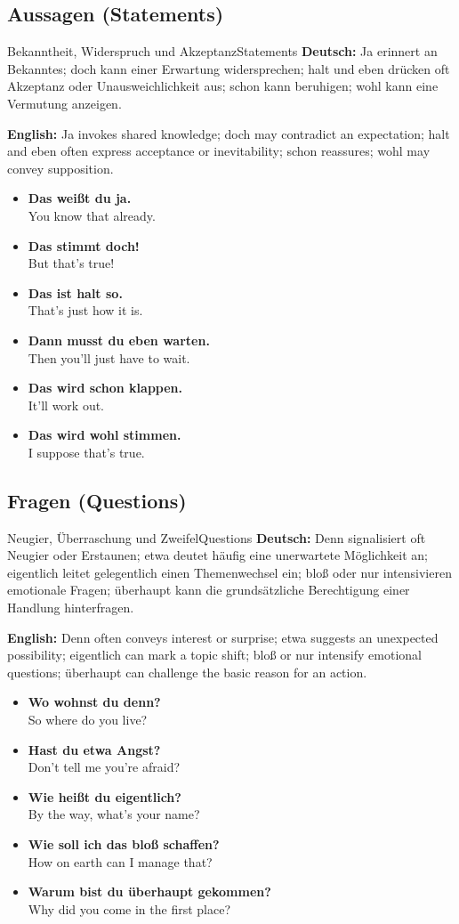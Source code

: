 \documentclass[a4paper,11pt]{article}
\newcommand{\GermanText}[1]{\textbf{Deutsch: }#1\par}
\newcommand{\EnglishText}[1]{{\small\color{SoftGray}\textbf{English: }#1\par}}
\newcommand{\ExampleItem}[2]{\item \textbf{#1}\\{\small\color{SoftGray}#2}}
\begin{document}
\subsection{Aussagen \textnormal{(Statements)}}
\begin{grammarentry}{Bekanntheit, Widerspruch und Akzeptanz}{Statements}
\GermanText{Ja erinnert an Bekanntes; doch kann einer Erwartung widersprechen; halt und eben drücken oft Akzeptanz oder Unausweichlichkeit aus; schon kann beruhigen; wohl kann eine Vermutung anzeigen.}
\EnglishText{Ja invokes shared knowledge; doch may contradict an expectation; halt and eben often express acceptance or inevitability; schon reassures; wohl may convey supposition.}
\end{grammarentry}
\begin{exbox}\begin{itemize}
\ExampleItem{Das weißt du ja.}{You know that already.}
\ExampleItem{Das stimmt doch!}{But that's true!}
\ExampleItem{Das ist halt so.}{That's just how it is.}
\ExampleItem{Dann musst du eben warten.}{Then you'll just have to wait.}
\ExampleItem{Das wird schon klappen.}{It'll work out.}
\ExampleItem{Das wird wohl stimmen.}{I suppose that's true.}
\end{itemize}\end{exbox}
\subsection{Fragen \textnormal{(Questions)}}
\begin{grammarentry}{Neugier, Überraschung und Zweifel}{Questions}
\GermanText{Denn signalisiert oft Neugier oder Erstaunen; etwa deutet häufig eine unerwartete Möglichkeit an; eigentlich leitet gelegentlich einen Themenwechsel ein; bloß oder nur intensivieren emotionale Fragen; überhaupt kann die grundsätzliche Berechtigung einer Handlung hinterfragen.}
\EnglishText{Denn often conveys interest or surprise; etwa suggests an unexpected possibility; eigentlich can mark a topic shift; bloß or nur intensify emotional questions; überhaupt can challenge the basic reason for an action.}
\end{grammarentry}
\begin{exbox}\begin{itemize}
\ExampleItem{Wo wohnst du denn?}{So where do you live?}
\ExampleItem{Hast du etwa Angst?}{Don't tell me you're afraid?}
\ExampleItem{Wie heißt du eigentlich?}{By the way, what's your name?}
\ExampleItem{Wie soll ich das bloß schaffen?}{How on earth can I manage that?}
\ExampleItem{Warum bist du überhaupt gekommen?}{Why did you come in the first place?}
\end{itemize}\end{exbox}
\end{document}
